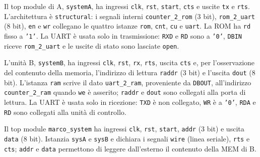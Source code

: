 
Il top module di A, \texttt{systemA}, ha ingressi \texttt{clk}, \texttt{rst}, \texttt{start}, \texttt{cts} e uscite \texttt{tx} e \texttt{rts}. L'architettura è \texttt{structural}: i segnali interni \texttt{counter\_2\_rom} (3 bit), \texttt{rom\_2\_uart} (8 bit), \texttt{en} e \texttt{wr} collegano le quattro istanze \texttt{rom}, \texttt{cnt}, \texttt{cu} e \texttt{uart}. La ROM ha \texttt{rd} fisso a \texttt{'1'}. La UART è usata solo in trasmissione: \texttt{RXD} e \texttt{RD} sono a \texttt{'0'}, \texttt{DBIN} riceve \texttt{rom\_2\_uart} e le uscite di stato sono lasciate \texttt{open}.


L'unità B, \texttt{systemB}, ha ingressi \texttt{clk}, \texttt{rst}, \texttt{rx}, \texttt{rts}, uscita \texttt{cts} e, per l'osservazione del contenuto della memoria, l'indirizzo di lettura \texttt{raddr} (3 bit) e l'uscita \texttt{dout} (8 bit). L'istanza \texttt{ram} scrive il dato \texttt{uart\_2\_ram}, proveniente da \texttt{DBOUT}, all'indirizzo \texttt{counter\_2\_ram} quando \texttt{we} è asserito; \texttt{raddr} e \texttt{dout} sono collegati alla porta di lettura. La UART è usata solo in ricezione: \texttt{TXD} è non collegato, \texttt{WR} è a \texttt{'0'}, \texttt{RDA} e \texttt{RD} sono collegati alla unità di controllo.


Il top module \texttt{marco\_system} ha ingressi \texttt{clk}, \texttt{rst}, \texttt{start}, \texttt{addr} (3 bit) e uscita \texttt{data} (8 bit). Istanzia \texttt{sysA} e \texttt{sysB} e dichiara i segnali \texttt{wire} (linea seriale), \texttt{rts} e \texttt{cts}; \texttt{addr} e \texttt{data} permettono di leggere dall'esterno il contenuto della MEM di B.


\simulazione

